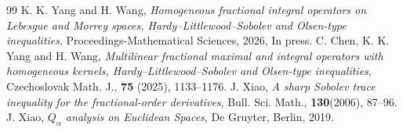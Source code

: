 \documentclass[10pt, reqno]{amsart}
\theoremstyle{definition}
\theoremstyle{remark}
\numberwithin{equation}{section}
\begin{document}
\begin{thebibliography}{99}
K. K. Yang and H. Wang, \emph{Homogeneous fractional integral operators on Lebesgue and Morrey spaces, Hardy--Littlewood--Sobolev and Olsen-type inequalities}, Proceedings-Mathematical Sciences, 2026, In press.
C. Chen, K. K. Yang and H. Wang, \emph{Multilinear fractional maximal and integral operators with homogeneous kernels, Hardy--Littlewood--Sobolev and Olsen-type inequalities}, Czechoslovak Math. J., \textbf{75} (2025), 1133--1176.
J. Xiao, \emph{A sharp Sobolev trace inequality for the fractional-order derivatives}, Bull. Sci. Math., \textbf{130}(2006), 87--96.
J. Xiao, \emph{$Q_{\alpha}$ analysis on Euclidean Spaces}, De Gruyter, Berlin, 2019.

\end{thebibliography}
\end{document}
